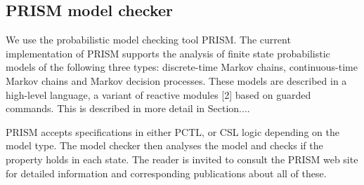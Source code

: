 \documentclass{llncs}
\begin{document}

\subsection{PRISM model checker}

We use the probabilistic model checking tool PRISM.
The current implementation of PRISM supports the analysis of finite state
probabilistic models of the following three types: discrete-time Markov chains,
continuous-time Markov chains and Markov decision processes. These models are
described in a high-level language, a variant of reactive modules [2] based on guarded
commands. This is described in more detail in Section....

PRISM accepts specifications in either PCTL, or CSL logic depending on the model
type. The model checker then analyses the model and checks if the property holds in each
state.
The reader is invited to consult the PRISM
web site \cite{} for detailed information and corresponding
publications about all of these.
\end{document}

